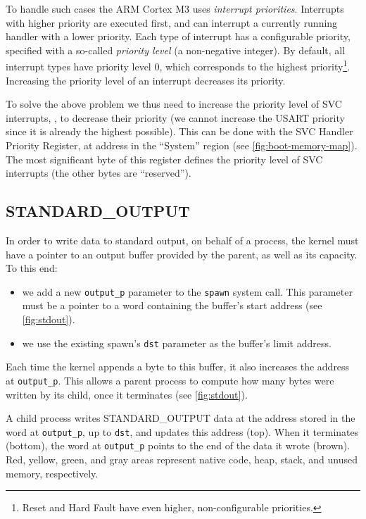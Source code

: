 To handle such cases the ARM Cortex M3 uses {\em interrupt priorities}.
Interrupts with higher priority are executed first, and can interrupt a
currently running handler with a lower priority. Each type of interrupt has a
configurable priority, specified with a so-called {\em priority level} (a
non-negative integer). By default, all interrupt types have priority level 0,
which corresponds to the highest priority\footnote{Reset and Hard Fault have
even higher, non-configurable priorities.}. Increasing the priority level of an
interrupt decreases its priority.

To solve the above problem we thus need to increase the priority level of SVC
interrupts, \ie, to decrease their priority (we cannot increase the USART
priority since it is already the highest possible). This can be done with the
SVC Handler Priority Register, at address  in the ``System''
region (see \cref{fig:boot-memory-map}). The most significant byte of this
register defines the priority level of SVC interrupts (the other bytes are
``reserved'').

\subsection{STANDARD\_OUTPUT}

In order to write data to standard output, on behalf of a process, the kernel
must have a pointer to an output buffer provided by the parent, as well as its
capacity. To this end:

\begin{itemize}
  \item we add a new {\tt output\_p} parameter to the {\tt spawn} system call.
  This parameter must be a pointer to a word containing the buffer's start
  address (see \cref{fig:stdout}).

  \item we use the existing spawn's {\tt dst} parameter as the buffer's
  limit address.
\end{itemize}

Each time the kernel appends a byte to this buffer, it also increases the
address at {\tt output\_p}. This allows a parent process to compute how many
bytes were written by its child, once it terminates (see \cref{fig:stdout}).

\begin{Figure}
  

  \caption{A child process writes STANDARD\_OUTPUT data at the address stored
  in the word at {\tt output\_p}, up to {\tt dst}, and updates this address
  (top). When it terminates (bottom), the word at {\tt output\_p} points to the
  end of the data it wrote (brown). Red, yellow, green, and gray areas
  represent native code, heap, stack, and unused memory,
  respectively.}\label{fig:stdout}
\end{Figure}

